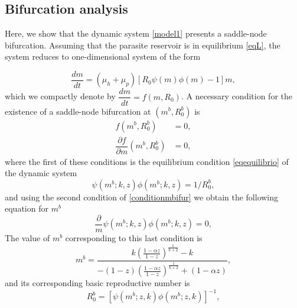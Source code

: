 \documentclass[eng]{MMSB-class-eng}
\begin{document}
\subsection{Bifurcation analysis}\label{bifurcacion}

{\color{red}

Here, we show that the dynamic system \eqref{model1} presents a saddle-node bifurcation. 
Assuming that the parasite reservoir is in equilibrium \eqref{eqL}, the system reduces to one-dimensional system of the form

\begin{equation*}
\dfrac{dm}{dt}=(\mu_h + \mu_p)\left[ R_0  \psi(m)\phi(m) -1 \right] m,%
\end{equation*}
which we compactly denote by
$\dfrac{dm}{dt}=f(m,R_0)$.
A necessary condition for the existence of a saddle-node bifurcation at 
$(m^{b},R_0^b)$ is
\begin{equation}\label{conditionmbifur}
\begin{split}
f(m^b,R_0^b)&=0,\\
\dfrac{\partial f}{\partial m}(m^b,R_0^b)&=0,
\end{split}
\end{equation}
where the first of these conditions is the equilibrium condition \eqref{eqequilibrio} of the dynamic system
\begin{equation*}
\psi(m^b;k,z)\phi(m^b;k,z)=1/R_0^b,
\end{equation*}
and using the second condition of \eqref{conditionmbifur} we obtain the following equation for $m^b$
\begin{equation}
\frac{\partial }{m}\psi(m^b;k,z)\phi(m^b;k,z)=0,	
\end{equation}
The value of $m^b$ corresponding to this last condition is
\begin{equation}
m^b=\dfrac{k\left( \frac{1-\alpha z}{1-z}\right)^{\frac{1}{k+2}} - k}{-(1-z)\left( \frac{1-\alpha z}{1-z}\right)^{\frac{1}{k+2}} + (1-\alpha z)},	
\end{equation}
and its corresponding basic reproductive number is
\begin{equation}
R_0^b=\left[ \psi(m^b;z,k)\phi(m^b;z,k)\right]^{-1},
\end{equation}	

}
\end{document}
